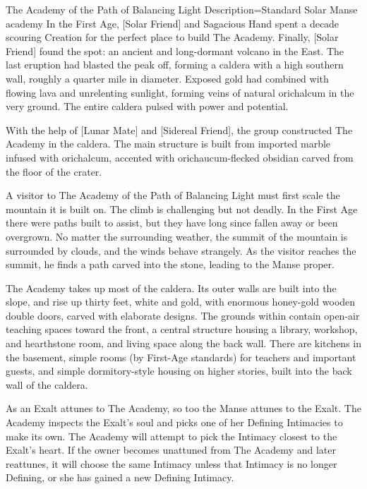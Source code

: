 \begin{Merit}{The Academy of the Path of Balancing Light}{
    Description=Standard Solar Manse
}{academy}
In the First Age, [Solar Friend] and Sagacious Hand spent a decade scouring
Creation for the perfect place to build The Academy. Finally, [Solar Friend]
found the spot: an ancient and long-dormant volcano in the East. The last
eruption had blasted the peak off, forming a caldera with a high southern wall,
roughly a quarter mile in diameter. Exposed gold had combined with flowing lava
and unrelenting sunlight, forming veins of natural orichalcum in the very
ground. The entire caldera pulsed with power and potential.

With the help of [Lunar Mate] and [Sidereal Friend], the group constructed The
Academy in the caldera. The main structure is built from imported marble
infused with orichalcum, accented with orichaucum-flecked obsidian carved from
the floor of the crater.

A visitor to The Academy of the Path of Balancing Light must first scale the
mountain it is built on. The climb is challenging but not deadly. In the First
Age there were paths built to assist, but they have long since fallen away or
been overgrown. No matter the surrounding weather, the summit of the mountain
is surrounded by clouds, and the winds behave strangely. As the visitor reaches
the summit, he finds a path carved into the stone, leading to the Manse proper.

The Academy takes up most of the caldera. Its outer walls are built into the
slope, and rise up thirty feet, white and gold, with enormous honey-gold wooden
double doors, carved with elaborate designs. The grounds within contain
open-air teaching spaces toward the front, a central structure housing a
library, workshop, and hearthstone room, and living space along the back wall.
There are kitchens in the basement, simple rooms (by First-Age standards)
for teachers and important guests, and simple dormitory-style housing on higher
stories, built into the back wall of the caldera.


As an Exalt attunes to The Academy, so too the Manse attunes to the Exalt. The
Academy inspects the Exalt's soul and picks one of her Defining Intimacies to
make its own. The Academy will attempt to pick the Intimacy closest to the
Exalt's heart. If the owner becomes unattuned from The Academy and later
reattunes, it will choose the same Intimacy unless that Intimacy is no longer
Defining, or she has gained a new Defining Intimacy.


\end{Merit}
